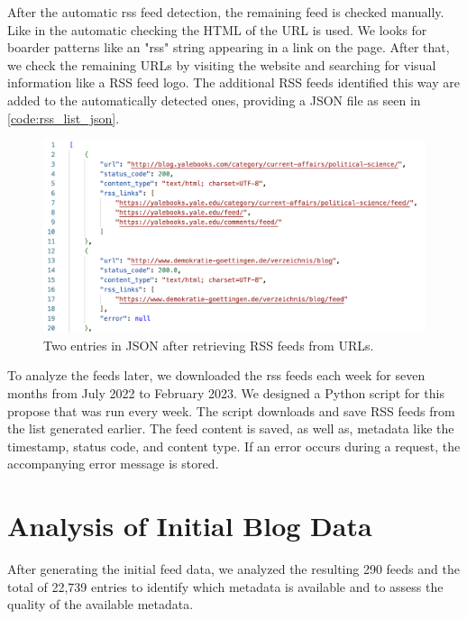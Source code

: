 \documentclass{article}
\begin{document}
After the automatic rss feed detection, the remaining feed is checked manually. Like in the automatic checking the HTML of the URL is used. We looks for boarder patterns like an "rss" string appearing in a link on the page. After that, we check the remaining URLs by visiting the website and searching for visual information like a RSS feed logo. The additional RSS feeds identified this way are added to the automatically detected ones, providing a JSON file as seen in \autoref{code:rss_list_json}.
\begin{figure}[htb]
	\includegraphics[width=.7\textwidth]{figures/rss_list_json.png}
	\caption{Two entries in JSON after retrieving RSS feeds from URLs.}
	\label{code:rss_list_json}
\end{figure}

To analyze the feeds later, we downloaded the rss feeds each week for seven months from July 2022 to February 2023. We designed a Python script for this propose that was run every week. The script downloads and save RSS feeds from the list generated earlier. The feed content is saved, as well as, metadata like the timestamp, status code, and content type. If an error occurs during a request, the accompanying error message is stored.

\section{Analysis of Initial Blog Data}\label{sec:analysis}

After generating the initial feed data, we analyzed the resulting 290 feeds and the total of 22,739 entries to identify which metadata is available and to assess the quality of the available metadata.
\end{document}
